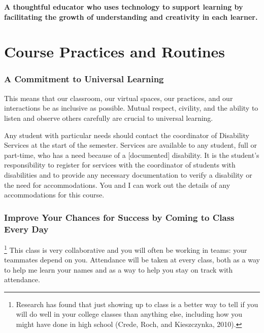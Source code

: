 \documentclass{tufte-handout}
\begin{document}
\begin{framed}
	\begin{center}
		\small\noindent\textbf{A thoughtful educator who uses technology to support learning by facilitating the growth of understanding and creativity in each learner.}
	\end{center}
\end{framed}

\normalsize

\newpage

\part{Course Practices and Routines}

\section{A Commitment to Universal Learning}
 This means that our classroom, our virtual spaces, our practices, and our interactions be as inclusive as possible. Mutual respect, civility, and the ability to listen and observe others carefully are crucial to universal learning.

Any student with particular needs should contact the coordinator of Disability Services at the start of the semester. Services are available to any student, full or part-time, who has a need because of a [documented] disability. It is the student's responsibility to register for services with the coordinator of students with disabilities and to provide any necessary documentation to verify a disability or the need for accommodations.  You and I can work out the details of any accommodations for this course.

\section{Improve Your Chances for Success by Coming to Class Every Day}
\footnote{Research has found that just showing up to class is a better way to tell if you will do well in your college classes than anything else, including how you might have done in high school (Crede, Roch, and Kieszczynka, 2010).} This class is very collaborative and you will often be working in teams: your teammates depend on you. Attendance will be taken at every class, both as a way to help me learn your names and as a way to help you stay on track with attendance.
\end{document}
